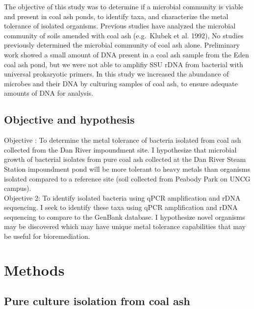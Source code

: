 \documentclass[ms]{uncgdissertationexp}
\theoremstyle{plain}
\theoremstyle{definition}
\theoremstyle{remark}
\begin{document}
  The objective of this study was to determine if a microbial community is
  viable and present in coal ash ponds, to identify taxa, and characterize
  the metal tolerance of isolated organisms. Previous studies have
  analyzed the microbial community of soils amended with coal ash
  (e.g.~Klubek et al. 1992), No studies previously determined the
  microbial community of coal ash alone. Preliminary work showed a small
  amount of DNA present in a coal ash sample from the Eden coal ash pond,
  but we were not able to amplifiy SSU rDNA from bacterial with universal
  prokaryotic primers. In this study we increased the abundance of
  microbes and their DNA by culturing samples of coal ash, to ensure
  adequate amounts of DNA for analysis.
  
  \subsection{Objective and hypothesis}\label{objective-and-hypothesis-1}
  
  Objective : To determine the metal tolerance of bacteria isolated from
  coal ash collected from the Dan River impoundment site. I hypothesize
  that microbial growth of bacterial isolates from pure coal ash collected
  at the Dan River Steam Station impoundment pond will be more tolerant to
  heavy metals than organisms isolated compared to a reference site (soil
  collected from Peabody Park on UNCG campus).\\
  Objective 2: To identify isolated bacteria using qPCR amplification and
  rDNA sequencing. I seek to identify these taxa using qPCR amplification
  and rDNA sequencing to compare to the GenBank database. I hypothesize
  novel organisms may be discovered which may have unique metal tolerance
  capabilities that may be useful for bioremediation.
  
  \section{Methods}\label{methods-1}
  
  \subsection{Pure culture isolation from coal
  ash}\label{pure-culture-isolation-from-coal-ash}
  
\end{document}
